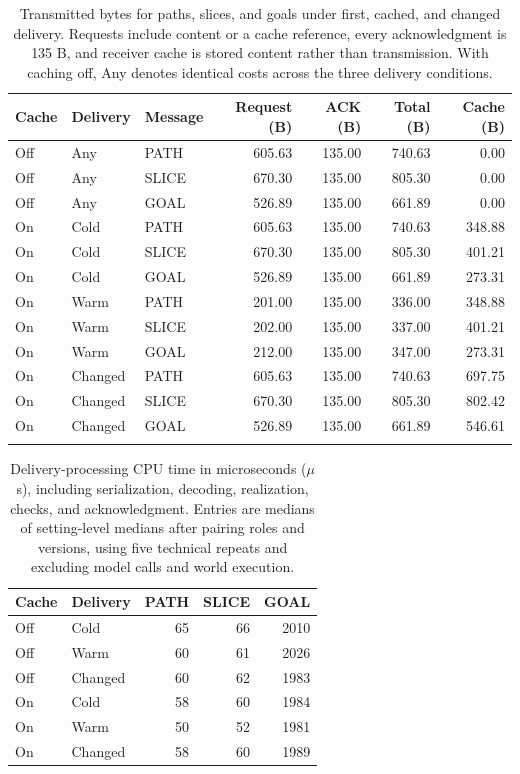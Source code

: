 \documentclass[sigconf,nonacm,balance=false]{aamas}
\newcommand{\tabstyle}{\small\setlength{\tabcolsep}{3pt}\renewcommand{\arraystretch}{1.10}}
\begin{document}
\begin{table}[!htbp]
\centering\tabstyle
\caption{Transmitted bytes for paths, slices, and goals under first, cached, and changed delivery. Requests include content or a cache reference, every acknowledgment is 135 B, and receiver cache is stored content rather than transmission. With caching off, Any denotes identical costs across the three delivery conditions.}
\label{tab:ps-full-ledger}
\begin{tabular}{@{}lllrrrr@{}}
\toprule
Cache & Delivery & Message & Request (B) & ACK (B) & Total (B) & Cache (B)\\\midrule
Off & Any & PATH & 605.63 & 135.00 & 740.63 & 0.00\\
Off & Any & SLICE & 670.30 & 135.00 & 805.30 & 0.00\\
Off & Any & GOAL & 526.89 & 135.00 & 661.89 & 0.00\\
\addlinespace
On & Cold & PATH & 605.63 & 135.00 & 740.63 & 348.88\\
On & Cold & SLICE & 670.30 & 135.00 & 805.30 & 401.21\\
On & Cold & GOAL & 526.89 & 135.00 & 661.89 & 273.31\\
\addlinespace
On & Warm & PATH & 201.00 & 135.00 & 336.00 & 348.88\\
On & Warm & SLICE & 202.00 & 135.00 & 337.00 & 401.21\\
On & Warm & GOAL & 212.00 & 135.00 & 347.00 & 273.31\\
\addlinespace
On & Changed & PATH & 605.63 & 135.00 & 740.63 & 697.75\\
On & Changed & SLICE & 670.30 & 135.00 & 805.30 & 802.42\\
On & Changed & GOAL & 526.89 & 135.00 & 661.89 & 546.61\\
\addlinespace
\bottomrule\end{tabular}\end{table}

\begin{table}[!htbp]
\centering\tabstyle
\caption{Delivery-processing CPU time in microseconds ($\mu$s), including serialization, decoding, realization, checks, and acknowledgment. Entries are medians of setting-level medians after pairing roles and versions, using five technical repeats and excluding model calls and world execution.}
\label{tab:ps-cpu-all}
\begin{tabular}{@{}llrrr@{}}
\toprule
Cache & Delivery & PATH & SLICE & GOAL\\\midrule
Off & Cold & 65 & 66 & 2010\\
Off & Warm & 60 & 61 & 2026\\
Off & Changed & 60 & 62 & 1983\\
On & Cold & 58 & 60 & 1984\\
On & Warm & 50 & 52 & 1981\\
On & Changed & 58 & 60 & 1989\\
\bottomrule\end{tabular}\end{table}
\end{document}
